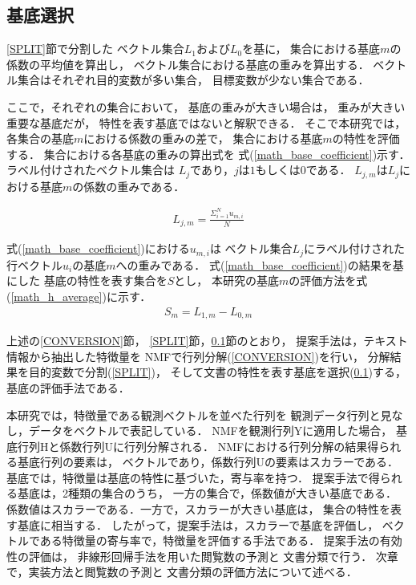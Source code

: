 \documentclass[12pt,a4paper,twocolumn,twoside]{jsik}
\begin{document}
\subsection{基底選択}\label{SELECTING}
\ref{SPLIT}節で分割した
ベクトル集合$L_{1}$および$L_{0}$を基に，
集合における基底$m$の係数の平均値を算出し，
ベクトル集合における基底の重みを算出する．
%
ベクトル集合はそれぞれ目的変数が多い集合，
目標変数が少ない集合である．

ここで，それぞれの集合において，
基底の重みが大きい場合は，
重みが大きい重要な基底だが，
特性を表す基底ではないと解釈できる．
%
そこで本研究では，
各集合の基底$m$における係数の重みの差で，
集合における基底$m$の特性を評価する．
%
集合における各基底の重みの算出式を
式(\ref{math_base_coefficient})示す．
%
ラベル付けされたベクトル集合は
$L_{j}$であり，$j$は$1$もしくは$0$である．
$L_{j,m}$は$L_{j}$における基底$m$の係数の重みである．

\begin{eqnarray}
\label{math_base_coefficient}
L_{j,m} = \frac{ \Sigma_{i=1}^{N}u_{m,i}}{N}
\end{eqnarray}

式(\ref{math_base_coefficient})における$u_{m,i}$は
ベクトル集合$L_{j}$にラベル付けされた
行ベクトル$u_{i}$の基底$m$への重みである．
%
式(\ref{math_base_coefficient})の結果を基にした
基底の特性を表す集合を$S$とし，
本研究の基底$m$の評価方法を式(\ref{math_h_average})に示す．
%
\begin{eqnarray}
\label{math_h_average}
S_{m} = L_{1,m} - L_{0,m}
\end{eqnarray}

上述の\ref{CONVERSION}節，
\ref{SPLIT}節，\ref{SELECTING}節のとおり，
提案手法は，テキスト情報から抽出した特徴量を
NMFで行列分解(\ref{CONVERSION})を行い，
分解結果を目的変数で分割(\ref{SPLIT})，
そして文書の特性を表す基底を選択(\ref{SELECTING})する，
基底の評価手法である．

本研究では，特徴量である観測ベクトルを並べた行列を
観測データ行列と見なし，データをベクトルで表記している．
%
NMFを観測行列Yに適用した場合，
基底行列Hと係数行列Uに行列分解される．
%
NMFにおける行列分解の結果得られる基底行列の要素は，
ベクトルであり，係数行列Uの要素はスカラーである．
%
基底では，特徴量は基底の特性に基づいた，寄与率を持つ．
%
提案手法で得られる基底は，2種類の集合のうち，
一方の集合で，係数値が大きい基底である．
係数値はスカラーである．一方で，スカラーが大きい基底は，
集合の特性を表す基底に相当する．
%
したがって，提案手法は，スカラーで基底を評価し，
ベクトルである特徴量の寄与率で，特徴量を評価する手法である．
%
提案手法の有効性の評価は，
非線形回帰手法を用いた閲覧数の予測と
文書分類で行う．
次章で，実装方法と閲覧数の予測と
文書分類の評価方法について述べる．
\end{document}
